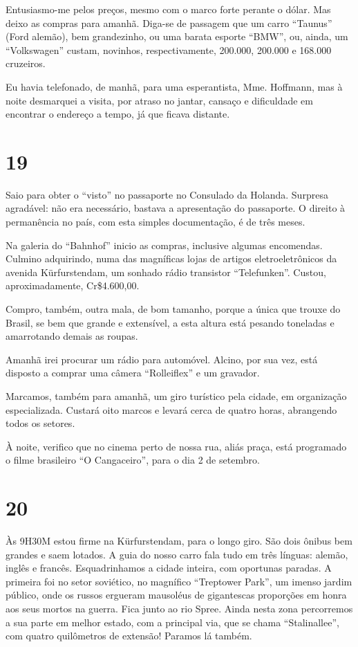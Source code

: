 Entusiasmo-me pelos preços, mesmo com o marco forte perante o dólar. Mas deixo as compras para amanhã. Diga-se de passagem que um carro “Taunus” (Ford alemão), bem grandezinho, ou uma barata esporte “BMW”, ou, ainda, um “Volkswagen” custam, novinhos, respectivamente, 200.000, 200.000 e 168.000 cruzeiros.

Eu havia telefonado, de manhã, para uma esperantista, Mme. Hoffmann, mas à noite desmarquei a visita, por atraso no jantar, cansaço e dificuldade em encontrar o endereço a tempo, já que ficava distante.

\section*{19 \adfflatleafright {}}
Saio para obter o “visto” no passaporte no Consulado da Holanda. Surpresa agradável: não era necessário, bastava a apresentação do passaporte. O direito à permanência no país, com esta simples documentação, é de três meses.

Na galeria do “Bahnhof” inicio as compras, inclusive algumas encomendas. Culmino adquirindo, numa das magníficas lojas de artigos eletroeletrônicos da avenida Kürfurstendam, um sonhado rádio transistor “Telefunken”. Custou, aproximadamente, Cr\$4.600,00.

Compro, também, outra mala, de bom tamanho, porque a única que trouxe do Brasil, se bem que grande e extensível, a esta altura está pesando toneladas e amarrotando demais as roupas.

Amanhã irei procurar um rádio para automóvel. Alcino, por sua vez, está disposto a comprar uma câmera “Rolleiflex” e um gravador.

Marcamos, também para amanhã, um giro turístico pela cidade, em organização especializada. Custará oito marcos e levará cerca de quatro horas, abrangendo todos os setores.

À noite, verifico que no cinema perto de nossa rua, aliás praça, está programado o filme brasileiro “O Cangaceiro”, para o dia 2 de setembro.

\section*{20 \adfflatleafright {}}
Às 9H30M estou firme na Kürfurstendam, para o longo giro. São dois ônibus bem grandes e saem lotados. A guia do nosso carro fala tudo em três línguas: alemão, inglês e francês. Esquadrinhamos a cidade inteira, com oportunas paradas. A primeira foi no setor soviético, no magnífico “Treptower Park”, um imenso jardim público, onde os russos ergueram mausoléus de gigantescas proporções em honra aos seus mortos na guerra. Fica junto ao rio Spree. Ainda nesta zona percorremos a sua parte em melhor estado, com a principal via, que se chama “Stalinallee”, com quatro quilômetros de extensão! Paramos lá também.

